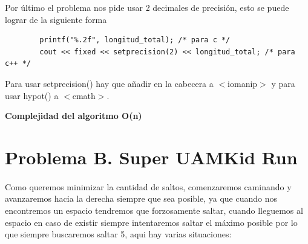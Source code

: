 \documentclass[12pt]{article}
\begin{document}
    Por último el problema nos pide usar 2 decimales de precisión, esto se puede lograr de la siguiente forma
    \begin{verbatim}
        printf("%.2f", longitud_total); /* para c */
        cout << fixed << setprecision(2) << longitud_total; /* para c++ */
    \end{verbatim}
    Para usar setprecision() hay que añadir en la cabecera a $<$iomanip$>$ y para usar hypot() a $<$cmath$>$.
    
    \vspace{1cm}
    \begin{flushright}
        \textbf{ Complejidad del algoritmo O(n) }
    \end{flushright}

    \newpage %
    
    \section*{Problema B. Super UAMKid Run}
    \paragraph{}
    \singlespacing
    Como queremos minimizar la cantidad de saltos, comenzaremos caminando y avanzaremos hacia la derecha siempre que sea posible,
    ya que cuando nos encontremos un espacio tendremos que forzosamente saltar, cuando lleguemos al espacio en caso de existir
    siempre intentaremos saltar el máximo posible por lo que siempre buscaremos saltar 5, aqui hay varias situaciones:
    
\end{document}
